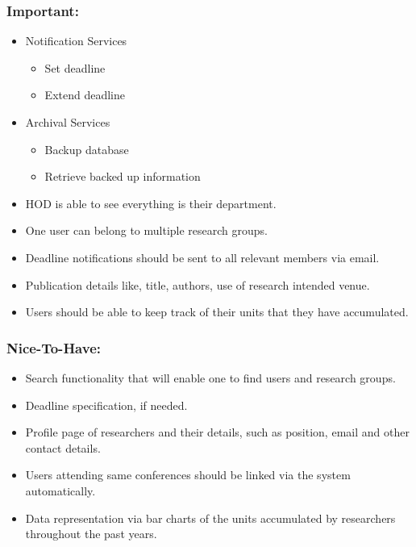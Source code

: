 \documentclass[11pt]{article}
\begin{document}
\subsubsection{Important:}	
	\begin{itemize}
		\item Notification Services
		\begin{itemize}
			\item Set deadline
			\item Extend deadline
		\end{itemize}
		\item Archival Services
		\begin{itemize}
			\item Backup  database
			\item Retrieve backed up information
		\end{itemize}
	\end{itemize}
	\begin{itemize}
		\item HOD is able to see everything is their department.
		\item One user can belong to multiple research groups.
		\item Deadline notifications should be sent to all relevant members via email.
		\item Publication details like, title, authors, use of research intended venue.
		\item Users should be able to keep track of their units that they have accumulated.
	\end{itemize} 
	
\subsubsection{Nice-To-Have:}
	\begin{itemize}
		\item Search functionality that will enable one to find users and research groups.
		\item Deadline specification, if needed.
		\item Profile page of researchers and their details, such as position, email and other contact details.
		\item Users attending same conferences should be linked via the system automatically.
		\item Data representation via bar charts of the units accumulated by researchers throughout the past years.
	\end{itemize}
\end{document}
